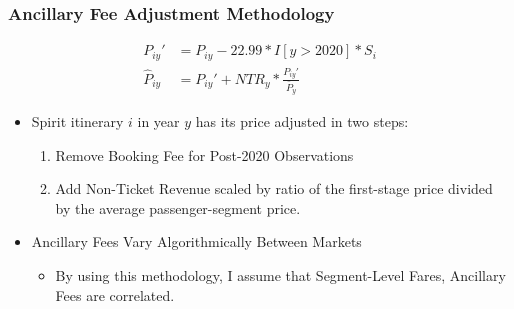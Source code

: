 \documentclass[xcolor=dvipsnames]{beamer}
\begin{document}
       \begin{frame}[noframenumbering, label = {Ancillary_Adjust_Methodology}]
        \frametitle{Ancillary Fee Adjustment Methodology}
    \begin{equation*}
    \begin{split}
      P_{iy}' &= P_{iy} - 22.99 * I[y > 2020] * S_{i}\\
     \hat{P}_{iy} &= P_{iy}' + NTR_{y} * \frac{P_{iy}'}{\bar{P}_{y}} 
    \end{split}
    \end{equation*} 
        
        \begin{itemize}
            \item Spirit itinerary $i$ in year $y$ has its price adjusted in two steps: 
            \begin{enumerate}
                \item Remove Booking Fee for Post-2020 Observations
                \item Add Non-Ticket Revenue scaled by ratio of the first-stage price divided by the average passenger-segment price. 
            \end{enumerate}
            \item Ancillary Fees Vary Algorithmically Between Markets
            \begin{itemize}
                \item By using this methodology, I assume that Segment-Level Fares, Ancillary Fees are correlated. 
            \end{itemize}
        \end{itemize}
    \hyperlink{Consumer_Surplus}{}
    \end{frame}
\end{document}
